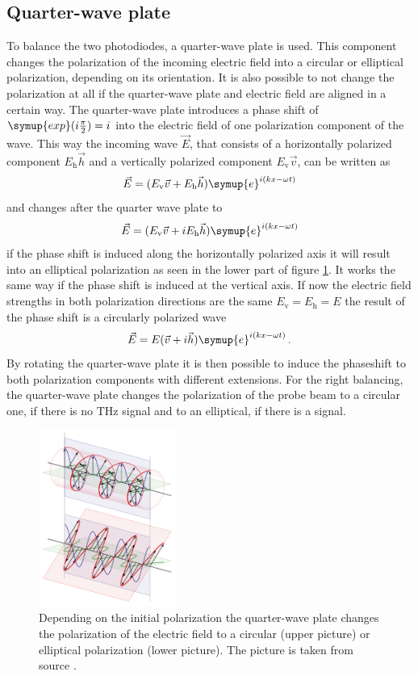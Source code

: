 \subsection{Quarter-wave plate}
\label{sec:qwp}
To balance the two photodiodes, a quarter-wave plate is used.
This component changes the polarization of the incoming electric field into a circular or elliptical polarization, depending on its orientation.
It is also possible to not change the polarization at all if the quarter-wave plate and electric field are aligned in a certain way.
The quarter-wave plate introduces a phase shift of $\symup{exp}(i\frac{\pi}{2}) = i$ into the electric field of one polarization component of the wave.
This way the incoming wave $\vec{E}$, that consists of a horizontally polarized component $E_\text{h}\vec{h}$ and a vertically polarized component $E_\text{v}\vec{v}$, can be written as
\begin{equation}
    \vec{E} = (E_\text{v}\vec{v} + E_\text{h}\vec{h})\symup{e}^{i(kx-\omega t)}
\end{equation}
and changes after the quarter wave plate to 
\begin{equation}
    \vec{E} = (E_\text{v}\vec{v} + i E_\text{h}\vec{h})\symup{e}^{i(kx-\omega t)}
\end{equation}
if the phase shift is induced along the horizontally polarized axis it will result into an elliptical polarization as seen in the lower part of figure \ref{fig:qwp}.
It works the same way if the phase shift is induced at the vertical axis.
If now the electric field strengths in both polarization directions are the same $E_\text{v} = E_\text{h} = E$ the result of the phase shift is a circularly polarized wave \cite{born_wolf_2019}
\begin{equation}
    \vec{E} = E(\vec{v} + i\vec{h})\symup{e}^{i(kx-\omega t)} \, .
\end{equation}
By rotating the quarter-wave plate it is then possible to induce the phaseshift to both polarization components with different extensions.
For the right balancing, the quarter-wave plate changes the polarization of the probe beam to a circular one, if there is no $\si{\tera\hertz}$ signal and to an elliptical, if there is a signal.
\begin{figure}
    \centering
    \includegraphics[width=0.4\textwidth]{refferenced_pic/qwp.png}
    \caption{Depending on the initial polarization the quarter-wave plate changes the polarization of the electric field to a circular (upper picture) or elliptical polarization (lower picture).
    The picture is taken from source \cite{qwp}.}
    \label{fig:qwp}
\end{figure}
\FloatBarrier
